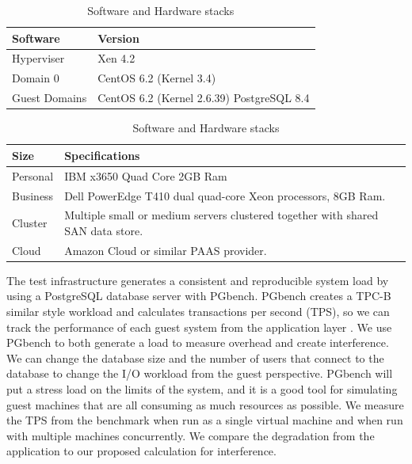\begin{table}[h]
\begin{subtable}[h]{0.45\textwidth}
\begin{tabular}{ l p{5cm} }
  Software & Version \\
  \hline
  Hyperviser & Xen 4.2 \\
  Domain 0 & CentOS 6.2 (Kernel 3.4) \\
  Guest Domains & CentOS 6.2 (Kernel 2.6.39) PostgreSQL 8.4 \\
  \hline
\end{tabular}
\caption{Software installed virtualization test stack}
\label{softStack}
\end{subtable}
\hfill
\begin{subtable}[h]{0.45\textwidth}
\begin{tabular}{ l p{5cm} }
  Size & Specifications \\
  \hline
  Personal & IBM x3650 Quad Core 2GB Ram \\
  Business & Dell PowerEdge T410 dual quad-core Xeon processors, 8GB Ram. \\
  Cluster & Multiple small or medium servers clustered together with shared SAN data store. \\
  Cloud & Amazon Cloud or similar PAAS provider. \\
  \hline
\end{tabular}
\caption{Virtualization sizes for tests}
\label{virtSize}
\end{subtable}
\caption{Software and Hardware stacks}
\end{table}

The test infrastructure generates a consistent and reproducible system load by using a PostgreSQL database server with PGbench.  
 PGbench creates a TPC-B similar style workload and calculates transactions per second (TPS), so we can track the performance of each guest system from the application layer \cite{pgTune}.  
 We use PGbench to both generate a load to measure overhead and create interference.  
 We can change the database size and the number of users that connect to the database to change the I/O workload from the guest perspective.
PGbench will put a stress load on the limits of the system, and it is a good tool for simulating guest machines that are all consuming as much resources as possible.  
 We measure the TPS from the benchmark when run as a single virtual machine and when run with multiple machines concurrently.  We compare the degradation from the application to our proposed calculation for interference.

